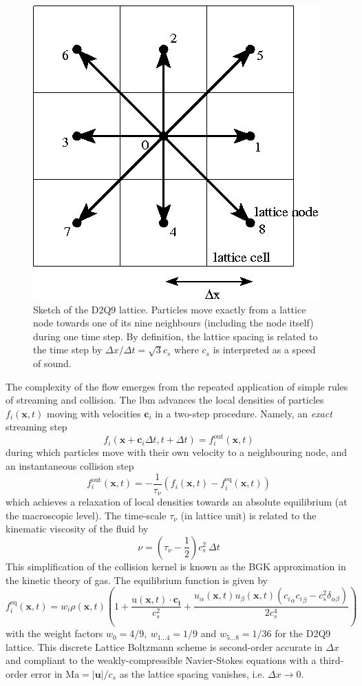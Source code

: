 \documentclass{jfm}
\begin{document}
\begin{figure}
	\centering
	\includegraphics[width=0.3\linewidth]{D2Q9/D2Q9}
	\caption{Sketch of the D2Q9 lattice. Particles move exactly from a lattice node towards one of its nine neighbours (including the node itself) during one time step. By definition, the lattice spacing is related to the time step by $\Delta x/ \Delta t = \sqrt{3} c_s$ where $c_s$ is interpreted as a speed of sound.}
	\label{fig:D2Q9}
\end{figure}


%
The complexity of the flow emerges from the repeated application of simple rules of streaming and collision. The \ac{lbm} advances the local densities of particles $f_i(\mathbf{x},t)$ moving with velocities $\mathbf{c}_i$  in a two-step procedure. Namely, an \emph{exact} streaming step 
\[
f_i(\mathbf{x}+\mathbf{c}_i \Delta t, t + \Delta t) = f_i^{\mathrm{out}}(\mathbf{x},t)
\]
during which particles move with their own velocity to a neighbouring node, and an instantaneous collision step
\[
f_i^{\mathrm{out}}(\mathbf{x},t) = -\frac 1 {\tau_\nu} \left(f_i(\mathbf{x},t) - f_i^\mathrm{eq}(\mathbf{x},t) \right)
\]
which achieves a relaxation of local densities towards an absolute equilibrium (at the macroscopic level). The time-scale $\tau_\nu$ (in lattice unit) is related to the kinematic viscosity of the fluid by 
\[
\nu = \left( {\tau_\nu} - \frac 1 2 \right) c_s^2 ~\Delta t
\]
This simplification of the collision kernel is known as the BGK approximation in the kinetic theory of gas.
%
The equilibrium function is given by
\[
f_i^\mathrm{eq}(\mathbf{x},t) = w_i  \rho(\mathbf{x},t) \left( 1 + \frac{\mathrm u(\mathbf{x},t) \cdot \mathbf{c_i}}{c_s^2} +
\frac{u_\alpha(\mathbf{x},t) u_\beta(\mathbf{x},t)({c_i}_\alpha {c_i}_\beta - c_s^2 \delta_{\alpha\beta})}{2 c_s^4} \right)
\] 
with the weight factors $w_0=4/9,~w_{1...4} = 1/9$ and $w_{5...8}=1/36$ for the D2Q9 lattice. 
This discrete Lattice Boltzmann scheme is second-order accurate in $\Delta x $ and compliant to the weakly-compressible Navier-Stokes equations with a third-order error in $\mathrm{Ma}=|\mathbf{u}|/c_s$ as the lattice spacing vanishes, i.e. $\Delta x \to 0$. 
\end{document}
